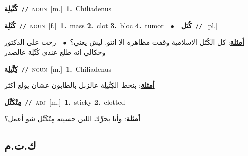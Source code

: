 \documentclass[10pt,a4paper,twoside]{article} %
\begin{document}
\begin{multicols}{2}
{\setlength\topsep{0pt}\textbf{\foreignlanguage{arabic}{كُتَّيلِة}}\ {\color{gray}\texttt{//}\color{black}}\ \textsc{noun}\ [m.]\ \textbf{1.}~Chiliadenus\ } \vspace{2mm}

{\setlength\topsep{0pt}\textbf{\foreignlanguage{arabic}{كُتْلِة}}\ {\color{gray}\texttt{//}\color{black}}\ \textsc{noun}\ [f.]\ \textbf{1.}~mass  \textbf{2.}~clot  \textbf{3.}~bloc  \textbf{4.}~tumor\ \ $\bullet$\ \ \setlength\topsep{0pt}\textbf{\foreignlanguage{arabic}{كُتَل}}\ {\color{gray}\texttt{//}\color{black}}\ [pl.]\  \begin{flushright}\color{gray}\foreignlanguage{arabic}{\textbf{\underline{\foreignlanguage{arabic}{أمثلة}}}: كل الكُتَل الاسلامية وقفت مظاهرة الا انتو. ليش يعني؟\ $\bullet$\ \  رحت على الدكتور وحكالي انه طلع عندي كُتْلِة عالصدر}\end{flushright}\color{black}} \vspace{2mm}

{\setlength\topsep{0pt}\textbf{\foreignlanguage{arabic}{كِتَّيلِة}}\ {\color{gray}\texttt{//}\color{black}}\ \textsc{noun}\ [m.]\ \textbf{1.}~Chiliadenus\  \begin{flushright}\color{gray}\foreignlanguage{arabic}{\textbf{\underline{\foreignlanguage{arabic}{أمثلة}}}: بنحط الكِتِّيلِة عالزبل بالطابون عشان يولع أكثر}\end{flushright}\color{black}} \vspace{2mm}

{\setlength\topsep{0pt}\textbf{\foreignlanguage{arabic}{مِتْكَتِّل}}\ {\color{gray}\texttt{//}\color{black}}\ \textsc{adj}\ [m.]\ \textbf{1.}~sticky  \textbf{2.}~clotted\  \begin{flushright}\color{gray}\foreignlanguage{arabic}{\textbf{\underline{\foreignlanguage{arabic}{أمثلة}}}: وأنا بحرِّك اللبن حسيته مِتْكَتِّل شو أعمل؟}\end{flushright}\color{black}} \vspace{2mm}

\vspace{-3mm}
\subsection*{\color{blue}\foreignlanguage{arabic}{ك.ت.م}\color{blue}{}} 


\end{multicols}
\end{document}
